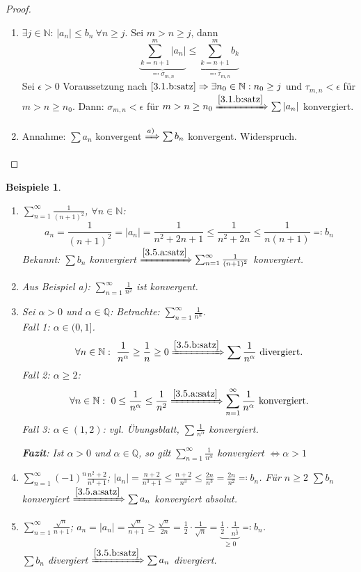 \documentclass[12pt]{extreport} %
\newcommand{\N}{\mathbb{N}}
\newcommand{\Q}{\mathbb{Q}}
\theoremstyle{named}
\theoremstyle{dotless}
\newtheorem*{beispiele}{Beispiele}
\begin{document}
\begin{proof} ~\
	\begin{enumerate}
		\item $\exists j \in \N$: $|a_{n}| \leq b_{n} ~\forall n \geq j$. Sei $m > n \geq j$, dann
			$$ \underbrace{\sum_{k=n+1}^{m}|a_{n}|}_{\eqqcolon \sigma_{m, n}} \leq \underbrace{\sum_{k=n+1}^{m} b_{k}}_{\eqqcolon \tau_{m,n}} $$
			Sei $\epsilon > 0$ Voraussetzung nach $\ref{3.1.b:satz} \Rightarrow \exists n_{0} \in \N: n_{0} \geq j$ und $\tau_{m,n} < \epsilon$ für $m > n \geq n_{0}$. Dann: $\sigma_{m,n} < \epsilon$ für $m > n \geq n_{0} \xRightarrow[]{\ref{3.1.b:satz}} \sum |a_{n}|$ konvergiert.
		\item Annahme: $\sum a_{n}$ konvergent $\xRightarrow[]{a)} \sum b_{n}$ konvergent. Widerspruch.
	\end{enumerate}	
\end{proof}


\begin{beispiele} ~\
	\begin{enumerate}
		\item $\sum_{n=1}^{\infty} \frac{1}{(n+1)^{2}}$, $\forall n \in \N$:
			$$ a_{n} = \frac{1}{(n+1)^{2}} = |a_{n}| = \frac{1}{n^{2} + 2n +1} \leq \frac{1}{n^{2} + 2n} \leq \frac{1}{n(n+1)} \eqqcolon b_{n} $$
			Bekannt: $\sum b_{n}$ konvergiert $\xRightarrow[]{\ref{3.5.a:satz}} \sum_{n=1}^{\infty} \frac{1}{(n+1)^{2}}$ konvergiert.
		\item Aus Beispiel a): $\sum_{n=1}^{\infty} \frac{1}{n^{2}}$ ist konvergent.
		\item Sei $\alpha > 0$ und $\alpha \in \Q$: Betrachte: $\sum_{n=1}^{\infty} \frac{1}{n^{\alpha}}$. \\
			Fall 1: $\alpha \in (0, 1]$.
				$$ \forall n \in \N: ~ \frac{1}{n^{\alpha}} \geq \frac{1}{n} \geq 0 \xRightarrow[]{\ref{3.5.b:satz}} \sum \frac{1}{n^{\alpha}} \text{ divergiert.} $$
			Fall 2: $\alpha \geq 2$:
				$$ \forall n \in \N: ~ 0 \leq \frac{1}{n^{\alpha}} \leq \frac{1}{n^{2}} \xRightarrow[]{\ref{3.5.a:satz}} \sum_{n=1}^{\infty} \frac{1}{n^{\alpha}} \text{ konvergiert.} $$
			Fall 3: $\alpha \in (1, 2)$: vgl. Übungsblatt, $\sum \frac{1}{n^{\alpha}}$ konvergiert. 
			
			\textbf{Fazit}: Ist $\alpha > 0$ und $\alpha \in \Q$, so gilt $\sum_{n=1}^{\infty} \frac{1}{n^{\alpha}}$ konvergiert $\Leftrightarrow \alpha > 1$
		\item $\sum_{n=1}^{\infty} (-1)^{n} \frac{n^{2} + 2}{n^{3} + 1}$; $|a_{n}| = \frac{n+2}{n^{3} + 1} \leq \frac{n+2}{n^{3}} \leq \frac{2n}{n^{3}} = \frac{2n}{n^{2}} \eqqcolon b_{n}$. Für $n \geq 2$ $\sum b_{n}$ konvergiert $\xRightarrow[]{\ref{3.5.a:satz}} \sum a_{n}$ konvergiert absolut.
		\item $\sum_{n=1}^{\infty} \frac{\sqrt{n}}{n+1}$; $a_{n} = |a_{n}| = \frac{\sqrt{n}}{n+1} \geq \frac{\sqrt{n}}{2n} = \frac{1}{2} \cdot \frac{1}{\sqrt{n}} = \underbrace{\frac{1}{2} \cdot \frac{1}{n^{\frac{1}{2}}}}_{\geq 0} \eqqcolon b_{n}$. \\
			$\sum b_{n}$ divergiert $\xRightarrow[]{\ref{3.5.b:satz}} \sum a_{n}$ divergiert.
	\end{enumerate}		
\end{beispiele}
\end{document}
